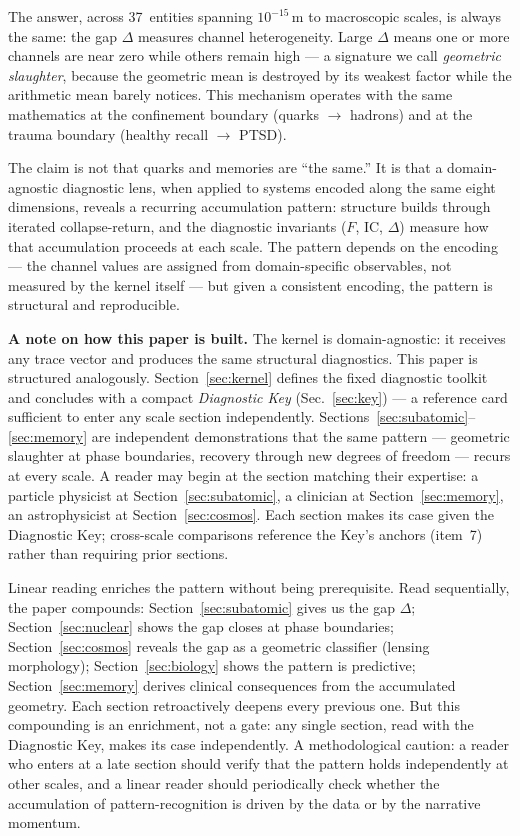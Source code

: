 \documentclass[
  aps,
  prd,
  twocolumn,
  superscriptaddress,
  nofootinbib,
  floatfix
]{revtex4-2}
\newcommand{\IC}{\mathrm{IC}}
\begin{document}
The answer, across 37~entities spanning $10^{-15}$\,m to
macroscopic scales, is always the same: the gap $\Delta$
measures channel heterogeneity.  Large $\Delta$ means one or
more channels are near zero while others remain high ---
a signature we call \emph{geometric slaughter}, because the
geometric mean is destroyed by its weakest factor while the
arithmetic mean barely notices.  This mechanism operates with
the same mathematics at the confinement boundary (quarks
$\to$ hadrons) and at the trauma boundary (healthy recall
$\to$ PTSD).

The claim is not that quarks and memories are ``the same.''
It is that a domain-agnostic diagnostic lens, when applied to
systems encoded along the same eight dimensions, reveals a
recurring accumulation pattern: structure builds through
iterated collapse-return, and the diagnostic invariants
($F$, $\IC$, $\Delta$) measure how that accumulation
proceeds at each scale.  The pattern depends on the encoding
--- the channel values are assigned from domain-specific
observables, not measured by the kernel itself --- but
given a consistent encoding, the pattern is structural
and reproducible.

\textbf{A note on how this paper is built.}
The kernel is domain-agnostic: it receives any trace vector
and produces the same structural diagnostics.  This paper is
structured analogously.  Section~\ref{sec:kernel} defines
the fixed diagnostic toolkit and concludes with a compact
\emph{Diagnostic Key} (Sec.~\ref{sec:key}) --- a reference
card sufficient to enter any scale section independently.
Sections~\ref{sec:subatomic}--\ref{sec:memory} are
independent demonstrations that the same pattern ---
geometric slaughter at phase boundaries, recovery through
new degrees of freedom --- recurs at every scale.  A reader
may begin at the section matching their expertise: a
particle physicist at Section~\ref{sec:subatomic}, a
clinician at Section~\ref{sec:memory}, an astrophysicist at
Section~\ref{sec:cosmos}.  Each section makes its case
given the Diagnostic Key; cross-scale comparisons reference
the Key's anchors (item~7) rather than requiring prior
sections.

Linear reading enriches the pattern without being
prerequisite.  Read sequentially, the paper compounds:
Section~\ref{sec:subatomic} gives us the gap $\Delta$;
Section~\ref{sec:nuclear} shows the gap closes at phase
boundaries; Section~\ref{sec:cosmos} reveals the gap as a
geometric classifier (lensing morphology);
Section~\ref{sec:biology} shows the pattern is predictive;
Section~\ref{sec:memory} derives clinical consequences from
the accumulated geometry.  Each section retroactively
deepens every previous one.  But this compounding is an
enrichment, not a gate: any single section, read with the
Diagnostic Key, makes its case independently.
A methodological caution: a reader who enters at a late
section should verify that the pattern holds independently
at other scales, and a linear reader should periodically
check whether the accumulation of pattern-recognition is
driven by the data or by the narrative momentum.
\end{document}
